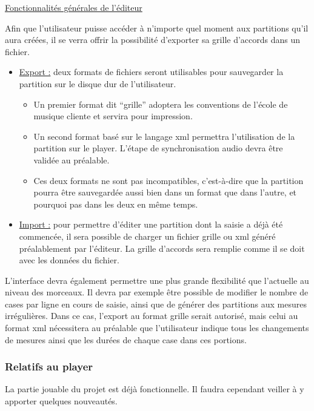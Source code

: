 \documentclass[a4paper,11pt]{article}
\begin{document}
\underline{Fonctionnalités générales de l'éditeur}

Afin que l'utilisateur puisse accéder à n'importe quel moment aux partitions qu'il aura créées, il se verra offrir la possibilité d'exporter sa grille d'accords dans un fichier.

\begin{itemize}
 \item \underline{Export :} deux formats de fichiers seront utilisables pour sauvegarder la partition sur le disque dur de l'utilisateur.
 \begin{itemize}
  \item Un premier format dit “grille” adoptera les conventions de l'école de musique cliente et servira pour impression.
  \item Un second format basé sur le langage xml permettra l'utilisation de la partition sur le player. L'étape de synchronisation audio devra être validée au préalable.
  \item Ces deux formats ne sont pas incompatibles, c'est-à-dire que la partition pourra être sauvegardée aussi bien dans un format que dans l'autre, et pourquoi pas dans les deux en même temps.
 \end{itemize}
 \item \underline{Import :} pour permettre d'éditer une partition dont la saisie a déjà été commencée, il sera possible de charger un fichier grille ou xml généré préalablement par l'éditeur. La grille d'accords sera remplie comme il se doit avec les données du fichier.
\end{itemize}

L'interface devra également permettre une plus grande flexibilité que l'actuelle au niveau des morceaux. Il devra par exemple être possible de modifier le nombre de cases par ligne en cours de saisie, ainsi que de générer des partitions aux mesures irrégulières. Dans ce cas, l'export au format grille serait autorisé, mais celui au format xml nécessitera au préalable que l'utilisateur indique tous les changements de mesures ainsi que les durées de chaque case dans ces portions.

\subsubsection*{Relatifs au player}

La partie jouable du projet est déjà fonctionnelle. Il faudra cependant veiller à y apporter quelques nouveautés.
\end{document}
